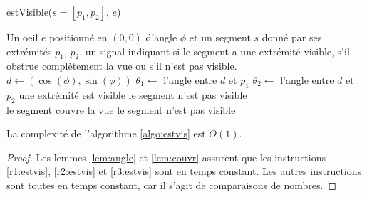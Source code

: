 \begin{algorithm}
  \caption{estVisible($s=[p_1, p_2]$, $e$)}\label{algo:estvis}
  \begin{algorithmic}[1]
    \REQUIRE Un oeil $e$ positionné en $(0, 0)$ d'angle $\phi$ et un segment $s$
    donné par ses extrémités $p_1$, $p_2$.
    \ENSURE un signal indiquant si le segment a une extrémité visible,
    s'il obstrue complètement la vue ou s'il n'est pas visible.
    \STATE $d\leftarrow (\cos(\phi), \sin(\phi))$
    \STATE $\theta_1\leftarrow$ l'angle entre $d$ et $p_1$ \label{r1:estvis}
    \STATE $\theta_2\leftarrow$ l'angle entre $d$ et $p_2$ \label{r2:estvis}
    \IF{$\theta_1\in[-\pi/4, \pi/4]\lor \theta_2\in[-\pi/4, \pi/4]$}
    \RETURN \og{}une extrémité est visible\fg{}
    \RETURN \og le segment n'est pas visible \fg \\
     \label{r3:estvis}
    \RETURN \og le segment couvre la vue\fg
    \ELSE
    \RETURN \og le segment n'est pas visible \fg
    \ENDIF
  \end{algorithmic}
\end{algorithm}

\begin{prop}
  La complexité de l'algorithme \ref{algo:estvis} est $O(1)$.
\end{prop}
\begin{proof}
  Les lemmes \ref{lem:angle} et \ref{lem:couvr} assurent que
  les instructions \ref{r1:estvis}, \ref{r2:estvis} et \ref{r3:estvis} sont en temps
  constant. Les autres instructions sont toutes en temps constant, car il s'agit
  de comparaisons de nombres.
\end{proof}


